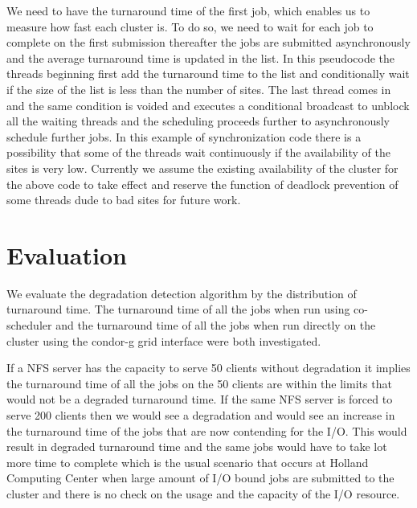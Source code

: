 \documentclass[ms,electronic,double]{nuthesis}
\begin{document}
We need to have the turnaround time of the first job,  which enables us to measure 
how fast each cluster is. To do so, we need to wait for each job to complete on 
the first submission thereafter the jobs are submitted asynchronously and the 
average turnaround time is updated in the list. In this pseudocode the threads 
beginning first add the turnaround time to the list and conditionally wait if 
the size of the list is less than the number of sites. The last thread comes in 
and the same condition is voided and executes a conditional broadcast to unblock 
all the waiting threads and the scheduling proceeds further to asynchronously schedule further 
jobs.
In this example of synchronization code there is a possibility that some of the 
threads wait continuously if the availability of the sites is very low. 
Currently we assume the existing availability of the cluster for the above code 
to take effect and reserve the function of deadlock prevention of some threads 
dude to bad sites for future work.

\chapter{Evaluation}

We evaluate the degradation detection algorithm by the distribution of turnaround time. The turnaround 
time of all the jobs when run using co-scheduler and the turnaround time of all 
the jobs when run directly on the cluster using the condor-g grid interface were both investigated.

If a NFS server has the capacity to serve 50 clients without degradation it
implies the turnaround time of all the jobs on the 50 clients are within the 
limits that would not be a degraded turnaround time. If the same NFS server is forced to serve 200 
clients then we would see a degradation and would see an increase in the turnaround time of the jobs
that are now contending for the I/O. This would result in degraded turnaround time and 
the same jobs would have to take lot more time to complete which is the usual 
scenario that occurs at Holland Computing Center when large amount of I/O bound 
jobs are submitted to the cluster and there is no check on the usage and the 
capacity of the I/O resource.
\end{document}

